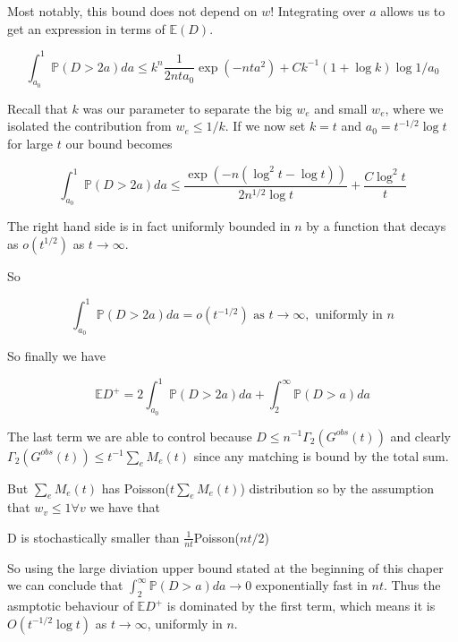 Most notably, this bound does not depend on $w$!  Integrating over $a$ allows us to get an expression in terms of $\mathbb{E}(D)$. 

\begin{equation}
\int_{a_0}^1 \mathbb{P}(D > 2a)da \leq k^n \frac{1}{2nta_0} \exp(-nta^2) + Ck^{-1}(1+\log k)\log{1/a_0}
\end{equation}

Recall that $k$ was our parameter to separate the big $w_e$ and small $w_e$, where we isolated the contribution from $w_e \leq 1/k$.  If we now set $k = t$ and $a_0 = t^{-1/2}\log t$ for large $t$ our bound becomes


\begin{equation}
\int_{a_0}^1 \mathbb{P}(D > 2a) da \leq \frac{\exp(-n(\log^2t - \log{t}))}{2n^{1/2}\log t} + \frac{C \log^2 t}{t}
\end{equation}

The right hand side is in fact uniformly bounded in $n$ by a function that decays as $o(t^{1/2})$ as $t \rightarrow \infty$.  

So 

$$ \int_{a_0}^1 \mathbb{P}(D > 2a)da = o(t^{-1/2}) \text{ as } t\rightarrow \infty, \text{ uniformly in } n $$

So finally we have 

$$ \mathbb{E}D^+ = 2\int_{a_0}^1 \mathbb{P}(D > 2a)da +\int_{2}^{\infty} \mathbb{P}(D > a)da $$

The last term we are able to control because $D \leq n^{-1}\Gamma_2(G^{obs}(t))$ and clearly $\Gamma_2(G^{obs}(t)) \leq t^{-1}\sum_eM_e(t)$ since any matching is bound by the total sum.  

But $\sum_eM_e(t)$ has Poisson($t\sum_eM_e(t)$) distribution so by the assumption that $w_v \leq 1 \forall v$ we have that 

\begin{center}
D is stochastically smaller than $\frac{1}{nt}$Poisson($nt/2$)
\end{center}

So using the large diviation upper bound stated at the beginning of this chaper we can conclude that $\int_{2}^{\infty} \mathbb{P}(D > a)da \rightarrow 0$
exponentially fast in $nt$.  Thus the asmptotic behaviour of $\mathbb{E}D^+$ is dominated by the first term, which means it is $O(t^{-1/2}\log{t})$ as $t \rightarrow \infty$, uniformly in $n$.  

